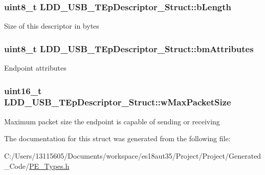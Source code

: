 \subsubsection[{b\+Length}]{\setlength{\rightskip}{0pt plus 5cm}uint8\+\_\+t L\+D\+D\+\_\+\+U\+S\+B\+\_\+\+T\+Ep\+Descriptor\+\_\+\+Struct\+::b\+Length}\label{struct_l_d_d___u_s_b___t_ep_descriptor___struct_ad4cc2b6088c7fb913f40eada94098393}
Size of this descriptor in bytes \hypertarget{struct_l_d_d___u_s_b___t_ep_descriptor___struct_a7a3e6205355d7fa84899f23ac8e58490}{}
\subsubsection[{bm\+Attributes}]{\setlength{\rightskip}{0pt plus 5cm}uint8\+\_\+t L\+D\+D\+\_\+\+U\+S\+B\+\_\+\+T\+Ep\+Descriptor\+\_\+\+Struct\+::bm\+Attributes}\label{struct_l_d_d___u_s_b___t_ep_descriptor___struct_a7a3e6205355d7fa84899f23ac8e58490}
Endpoint attributes \hypertarget{struct_l_d_d___u_s_b___t_ep_descriptor___struct_a19e3e6b0524f2fcd25377f008c94c3c6}{}
\subsubsection[{w\+Max\+Packet\+Size}]{\setlength{\rightskip}{0pt plus 5cm}uint16\+\_\+t L\+D\+D\+\_\+\+U\+S\+B\+\_\+\+T\+Ep\+Descriptor\+\_\+\+Struct\+::w\+Max\+Packet\+Size}\label{struct_l_d_d___u_s_b___t_ep_descriptor___struct_a19e3e6b0524f2fcd25377f008c94c3c6}
Maximum packet size the endpoint is capable of sending or receiving 

The documentation for this struct was generated from the following file\+:\begin{DoxyCompactItemize}
\item 
C\+:/\+Users/13115605/\+Documents/workspace/es18aut35/\+Project/\+Project/\+Generated\+\_\+\+Code/\hyperlink{_p_e___types_8h}{P\+E\+\_\+\+Types.\+h}\end{DoxyCompactItemize}
